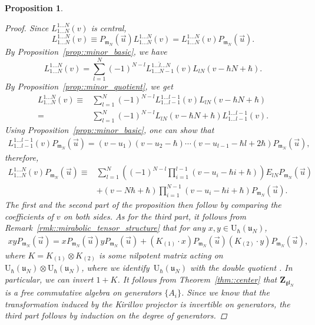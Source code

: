 \documentclass[pdftex]{sigma}
\numberwithin{equation}{section}
\newtheorem{Proposition}[Theorem]{Proposition}
{ \theoremstyle{definition}
	\newtheorem{Definition}[Theorem]{Definition}
	\newtheorem{Note}[Theorem]{Note}
	\newtheorem{Example}[Theorem]{Example}
	\newtheorem{Remark}[Theorem]{Remark} }
\newcommand{\U}{\mathrm{U}_{\hbar}}
\newcommand{\Z}{\mathbf{Z}}
\renewcommand{\b}{\mathfrak{b}}
\newcommand{\n}{\mathfrak{n}}
\renewcommand{\u}{\mathfrak{u}}
\newcommand{\m}{\mathfrak{m}}
\newcommand{\gl}{\mathfrak{gl}}
\begin{document}
\begin{Proposition}
\begin{proof}
			Since $L_{1\dots N}^{1\dots N}(v)$ is central,
			\[
			L_{1\dots N}^{1\dots N}(v) \equiv P_{\m_N} (\vec{u}) L_{1\dots N}^{1\dots N}(v) = L_{1\dots N}^{1\dots N}(v) P_{\m_N} (\vec{u}).
			\]
			By Proposition~\ref{prop::minor_basic}, we have
			\[
			L_{1\dots N}^{1\dots N}(v) = \sum\limits_{l=1}^N (-1)^{N-l} L_{1\dots N-1}^{1\dots \hat{l} \dots N}(v) L_{lN}(v-\hbar N+\hbar).
			\]
			By Proposition~\ref{prop::minor_quotient}, we get
			\begin{align*}
				L_{1\dots N}^{1\dots N}(v) \equiv{} &\sum\limits_{l=1}^N (-1)^{N-l} L_{1\dots l-1}^{1\dots l-1}(v) L_{lN}(v-\hbar N+\hbar) \\
				={}&\sum\limits_{l=1}^N (-1)^{N-l} L_{lN}(v-\hbar N+\hbar) L_{1\dots l-1}^{1\dots l-1}(v).
			\end{align*}
			Using Proposition~\ref{prop::minor_basic}, one can show that
			\begin{align*}
				L_{1\dots l-1}^{1\dots l-1}(v) P_{\m_N} (\vec{u})=(v-u_1) (v-u_2-\hbar) \cdots (v-u_{l-1} - \hbar l+2\hbar) P_{\m_N} (\vec{u}),
			\end{align*}
			therefore,
			\begin{align*}
					L_{1\dots N}^{1\dots N}(v) P_{\m_N} (\vec{u}) \equiv{}& \sum_{l=1}^N \left((-1)^{N-l} \prod_{i=1}^{l-1}(v-u_i - \hbar i+\hbar) \right) E_{lN} P_{\m_N} (\vec{u}) \\
					&+(v-N\hbar + \hbar)\prod_{i=1}^{N-1}(v - u_i -\hbar i + \hbar) P_{\m_N} (\vec{u}).
			\end{align*}
			The first and the second part of the proposition then follow by comparing the coefficients of $v$ on both sides. As for the third part, it follows from Remark~\ref{rmk::mirabolic_tensor_structure} that for any $x,y\in \U(\u_N)$,
			\begin{align*}
				xy P_{\m_N}(\vec{u}) = x P_{\m_N}(\vec{u}) y P_{\m_N}(\vec{u}) + (K_{(1)} \cdot x) P_{\m_N}(\vec{u}) (K_{(2)} \cdot y) P_{\m_N}(\vec{u}),
			\end{align*}
			where $K = K_{(1)} \otimes K_{(2)}$ is some nilpotent matrix acting on $\U(\u_N) \otimes \U(\u_N)$, where we identify~$\U(\u_N)$ with the double quotient \smash{$\n_-^{\psi} \backslash \U(\gl_N) / \b^{\vec{u}}$}. In particular, we can invert $1 + K$. It follows from Theorem~\ref{thm::center} that $\Z_{\gl_N}$ is a free commutative algebra on generators $\{A_i\}$. Since we know that the transformation induced by the Kirillov projector is invertible on generators, the third part follows by induction on the degree of generators.
		\end{proof}
	\end{Proposition}
	
\end{document}
